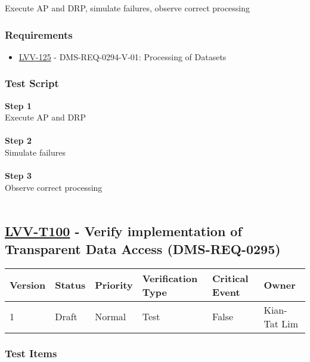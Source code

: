 Execute AP and DRP, simulate failures, observe correct processing

\hypertarget{requirements-76}{%
\subsubsection{Requirements}\label{requirements-76}}

\begin{itemize}
\tightlist
\item
  \href{https://jira.lsstcorp.org/browse/LVV-125}{LVV-125} -
  DMS-REQ-0294-V-01: Processing of Datasets
\end{itemize}

\hypertarget{test-script-76}{%
\subsubsection{Test Script}\label{test-script-76}}

\textbf{Step 1}\\
Execute AP and DRP\\
~\\
\textbf{Step 2}\\
\hspace*{0.333em}Simulate failures\\
~\\
\textbf{Step 3}\\
Observe correct processing\\
~\\

\hypertarget{lvv-t100---verify-implementation-of-transparent-data-access-dms-req-0295}{%
\subsection{\texorpdfstring{\href{https://jira.lsstcorp.org/secure/Tests.jspa\#/testCase/LVV-T100}{LVV-T100}
- Verify implementation of Transparent Data Access
(DMS-REQ-0295)}{LVV-T100 - Verify implementation of Transparent Data Access (DMS-REQ-0295)}}\label{lvv-t100---verify-implementation-of-transparent-data-access-dms-req-0295}}

\begin{longtable}[]{@{}llllll@{}}
\toprule
Version & Status & Priority & Verification Type & Critical Event &
Owner\tabularnewline
\midrule
\endhead
1 & Draft & Normal & Test & False & Kian-Tat Lim\tabularnewline
\bottomrule
\end{longtable}

\hypertarget{test-items-76}{%
\subsubsection{Test Items}\label{test-items-76}}

